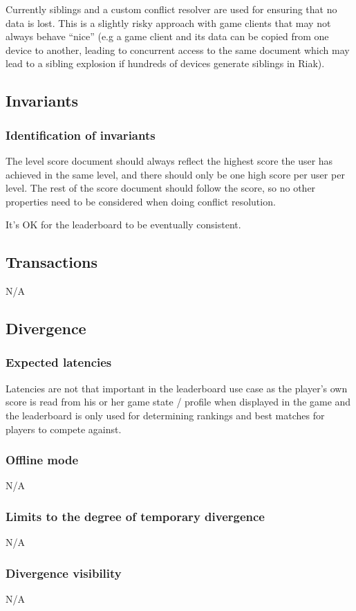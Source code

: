 \documentclass[11pt,a4paper]{report}
\begin{document}
Currently siblings and a custom conflict resolver are used for ensuring that no data is lost. This is a slightly risky approach with game clients that may not always behave ``nice'' (e.g a game client and its data can be copied from one device to another, leading to concurrent access to the same document which may lead to a sibling explosion if hundreds of devices generate siblings in Riak).

\subsection{Invariants}
\subsubsection{Identification of invariants}
The level score document should always reflect the highest score the user has achieved in the same level, and there should only be one high score per user per level. The rest of the score document should follow the score, so no other properties need to be considered when doing conflict resolution.

It's OK for the leaderboard to be eventually consistent.
\subsection{Transactions}
N/A
\subsection{Divergence}
\subsubsection{Expected latencies}
Latencies are not that important in the leaderboard use case as the player's own score is read from his or her game state / profile when displayed in the game and the leaderboard is only used for determining rankings and best matches for players to compete against.

\subsubsection{Offline mode}
N/A

\subsubsection{Limits to the degree of temporary divergence}
N/A

\subsubsection{Divergence visibility}
N/A
\end{document}

